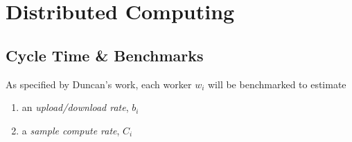 \documentclass[../mthe-493-final-project.tex]{subfiles}
\begin{document}



    \section{Distributed Computing}
    \label{sec:distributed-computing-implementation}


    \subsection{Cycle Time \& Benchmarks}
    \label{ssec:cycle-time-and-benchmarks}


    As specified by Duncan's work, each worker $w_i$ will be benchmarked to estimate

    \begin{enumerate}
        \item an \textit{upload/download rate}, $b_i$
        \item a \textit{sample compute rate}, $C_i$
    \end{enumerate}
\end{document}
